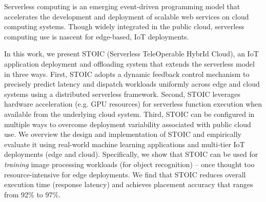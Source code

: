 Serverless computing is an emerging event-driven programming model that accelerates the development and deployment of scalable web services on cloud computing systems. Though widely integrated in the public cloud, serverless computing 
use is nascent for edge-based, IoT deployments.

In this work, we present STOIC (Serverless TeleOperable HybrId Cloud), an IoT application deployment and offloading system that extends the serverless model in three ways. First, STOIC adopts a dynamic feedback control mechanism to precisely predict latency and dispatch workloads uniformly across edge and cloud systems using a distributed serverless framework. Second, STOIC leverages hardware acceleration (e.g. GPU resources) for serverless function execution when available from the underlying cloud system. Third, STOIC can be configured in multiple ways to overcome deployment variability associated with public cloud use. We overview the design and implementation of STOIC and empirically evaluate it using real-world machine learning applications and multi-tier IoT deployments (edge and cloud). Specifically, we show that STOIC can be used for \textit{training} image processing workloads (for object recognition) -- once thought too resource-intensive for edge deployments. We find that STOIC reduces overall execution time (response latency) and achieves placement accuracy that ranges from 92\% to 97\%.
